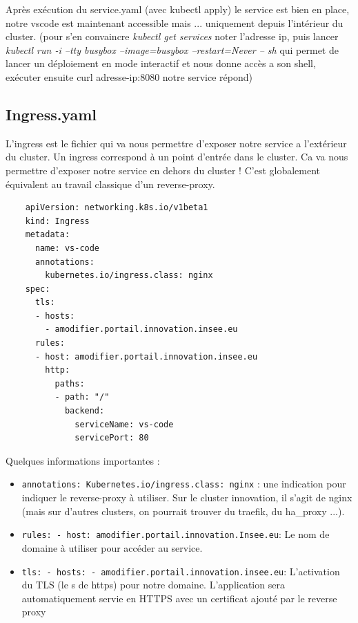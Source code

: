 \documentclass[11pt,fleqn]{book} %
\begin{document}
Après exécution du service.yaml (avec kubectl apply) le service est bien en place, notre vscode est maintenant accessible mais ... uniquement depuis l'intérieur du cluster. (pour s'en convaincre \textit{kubectl get services} noter l'adresse ip, puis lancer  \textit{kubectl run -i --tty busybox --image=busybox --restart=Never -- sh } qui permet de lancer un déploiement en mode interactif et nous donne accès a son shell, exécuter ensuite curl adresse-ip:8080 notre service répond)

\subsection*{Ingress.yaml}
L'ingress est le fichier qui va nous permettre d'exposer notre service a l'extérieur du cluster. Un ingress correspond à un point d'entrée dans le cluster. Ca va nous permettre d'exposer notre service en dehors du cluster ! C'est globalement équivalent au travail classique d'un reverse-proxy.

\begin{verbatim}
    apiVersion: networking.k8s.io/v1beta1
    kind: Ingress
    metadata:
      name: vs-code
      annotations:
        kubernetes.io/ingress.class: nginx
    spec:
      tls:
      - hosts:
        - amodifier.portail.innovation.insee.eu
      rules:
      - host: amodifier.portail.innovation.insee.eu
        http:
          paths:
          - path: "/"
            backend:
              serviceName: vs-code
              servicePort: 80
\end{verbatim}
Quelques informations importantes :

\begin{itemize}
    \item \texttt{annotations: Kubernetes.io/ingress.class: nginx} : une indication pour indiquer le reverse-proxy à utiliser. Sur le cluster innovation, il s'agit de nginx (mais sur d'autres clusters, on pourrait trouver du traefik, du ha\_proxy ...).
    \item \texttt{rules: - host: amodifier.portail.innovation.Insee.eu}: Le nom de domaine à utiliser pour accéder au service.
    \item \texttt{tls: - hosts: - amodifier.portail.innovation.insee.eu}: L'activation du TLS (le s de https) pour notre domaine. L'application sera automatiquement servie en HTTPS avec un certificat ajouté par le reverse proxy\\
\end{itemize}
\end{document}
